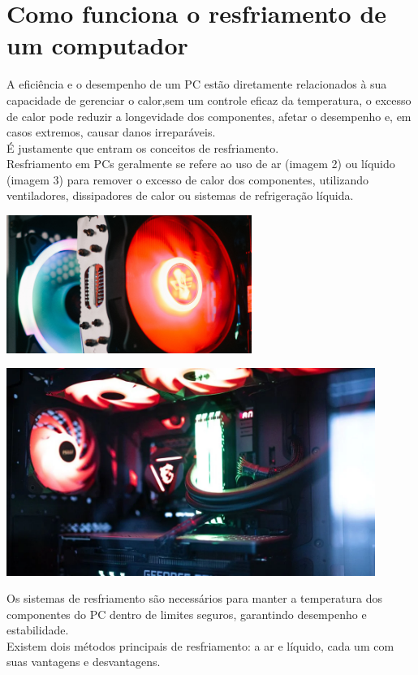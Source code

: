 \documentclass[12pt]{article}
\begin{document}
\section{Como funciona o resfriamento de um computador}
A eficiência e o desempenho de um PC estão diretamente relacionados à sua capacidade de gerenciar o calor,sem um controle eficaz da temperatura, o excesso de calor pode reduzir a longevidade dos componentes, afetar o desempenho e, em casos extremos, causar danos irreparáveis. 
\\
É justamente que entram os conceitos de resfriamento.
\\
Resfriamento em PCs geralmente se refere ao uso de ar (imagem 2) ou líquido (imagem 3) para remover o excesso de calor dos componentes, utilizando ventiladores, dissipadores de calor ou sistemas de refrigeração líquida.
\begin{adjustbox}{center,caption={Air Cooler de computador em detalhe},nofloat=figure,vspace=\bigskipamount}
    \includegraphics[width=8cm]{cooler.png}

\end{adjustbox}
\begin{adjustbox}{center,caption={Computador Gamer que utiliza refrigeração liquida},nofloat=figure,vspace=\bigskipamount}
    \includegraphics[width=12cm]{gaymer.png}
\end{adjustbox}
Os sistemas de resfriamento são necessários para manter a temperatura dos componentes do PC dentro de limites seguros, garantindo desempenho e estabilidade. \\
Existem dois métodos principais de resfriamento: a ar e líquido, cada um com suas vantagens e desvantagens.\\
\end{document}
